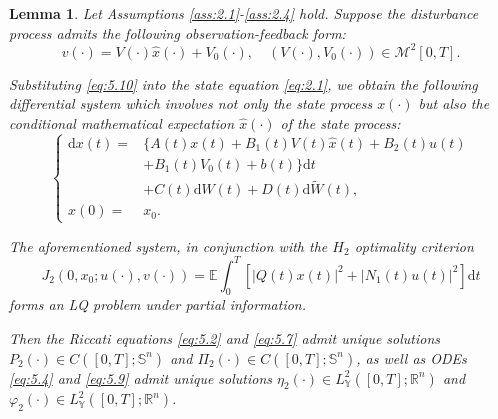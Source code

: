 \documentclass[10pt,a4paper]{amsart}
\newtheorem{lem}{Lemma}
\begin{document}
\begin{lem}\label{lem:5.2}
	Let Assumptions \ref{ass:2.1}-\ref{ass:2.4} hold. Suppose the disturbance process admits the following observation-feedback form:
	\begin{equation}\label{eq:5.10}
		v(\cdot) = V(\cdot)\widehat{x}(\cdot) + V_0(\cdot), \quad(V(\cdot),V_0(\cdot)) \in \mathcal{M}^2[0,T].
	\end{equation}
	
	Substituting \eqref{eq:5.10} into the state equation \eqref{eq:2.1}, we obtain the following differential system which involves not only the state process $x(\cdot)$ but also the conditional mathematical expectation $\widehat{x}(\cdot)$ of the state process:
	\begin{equation}\label{eq:5.11}
		\left\{
		\begin{aligned}
			\mathrm{d}x(t) =& \Big\{ A(t)x(t) + B_1(t)V(t)\widehat{x}(t) + B_2(t)u(t) \\
			&+ B_1(t)V_0(t) + b(t) \Big\} \mathrm{d}t \\
			&+ C(t)\mathrm{d}W(t) + D(t)\mathrm{d}\widetilde{W}(t),\\
			x(0)=&x_0.
		\end{aligned}  
		\right.
	\end{equation}
	
	The aforementioned system, in conjunction with the $H_2$ optimality criterion \[J_2(0,x_0;u(\cdot),v(\cdot)) = \mathbb{E}\int_0^T [|Q(t)x(t)|^2 + |N_1(t)u(t)|^2] \mathrm{d}t\] forms an LQ problem under partial information.
	
	Then the Riccati equations \eqref{eq:5.2} and \eqref{eq:5.7} admit unique solutions $P_2(\cdot) \in C([0,T];\mathbb{S}^n)$ and $\Pi_2(\cdot) \in C([0,T];\mathbb{S}^n)$, as well as ODEs \eqref{eq:5.4} and \eqref{eq:5.9} admit unique solutions $\eta_2(\cdot) \in L_{\mathbb{Y}}^2([0,T];\mathbb{R}^n)$ and $\varphi_2(\cdot) \in L_{\mathbb{Y}}^2([0,T];\mathbb{R}^n)$.
	

\end{lem}
\end{document}
